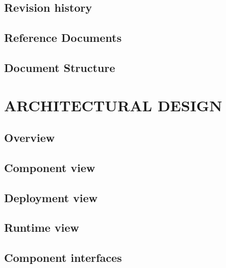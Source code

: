 \documentclass[11pt]{report}
\begin{document}
		\section{Revision history}
		\label{sect:Revision history}
			
		\section{Reference Documents}
		\label{sect:Documents}
			
		\section{Document Structure}
		\label{sect:Document Structure}
			
	\chapter{ARCHITECTURAL DESIGN}
	\label{ch:ARCHITECTURAL DESIGN}
	
		\section{Overview}
		\label{sect:Overview}
			
			
		\section{Component view}
		\label{sect:Component view}
			
			
		\section{Deployment view}
		\label{sect:Deployment view}
			
			
		\section{Runtime view}
		\label{sect:Runtime view}
			
		\section{Component interfaces}
		\label{sect:Component interfaces}
		
\end{document}
